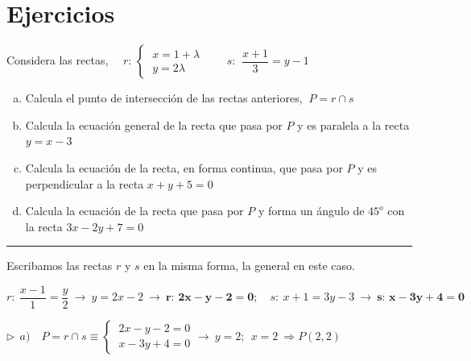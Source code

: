 \vspace{5mm}
\section{Ejercicios}

\vspace{0.5cm}


	


\begin{miejercicio}

Considera las rectas, $\quad r:\, \begin{cases} \ x=1+\lambda \\ \ y=2\lambda \end{cases}\qquad s:\, \ \dfrac{x+1}{3}=y-1 $

\begin{enumerate}[a) ]
\item Calcula el punto de intersección de las rectas anteriores, $\ P=r\cap s$
\item Calcula la ecuación general de la recta que pasa por $P$ y es paralela a la recta $y=x-3$
\item Calcula la ecuación de la recta, en forma continua, que pasa por $P$ y es perpendicular a la recta $x+y+5=0$
\item Calcula la ecuación de la recta que pasa por $P$ y forma un ángulo de $45^o$ con la recta $3x-2y+7=0$	
\end{enumerate}

\rule{250pt}{0.1pt}

\vspace{2mm} Escribamos las rectas $r$ y $s$ en la misma forma, la general en este caso.

\vspace{2mm} $r:\ \dfrac{x-1}{1}=\dfrac{y}{2}\ \to \  y=2x-2 \ \to \ \boldsymbol{r:\, 2x-y-2=0};\quad s:\ x+1=3y-3 \ \to \ \boldsymbol{s:\, x-3y+4=0}$

\vspace{5mm} $\triangleright \ \ a)\quad P=r\cap s \equiv \begin{cases} \ 2x-y-2=0\\ \ x-3y+4=0 \end{cases} \to \ y=2;\ \ x=2 \ \Rightarrow P(2,2)$ 


\end{miejercicio}
